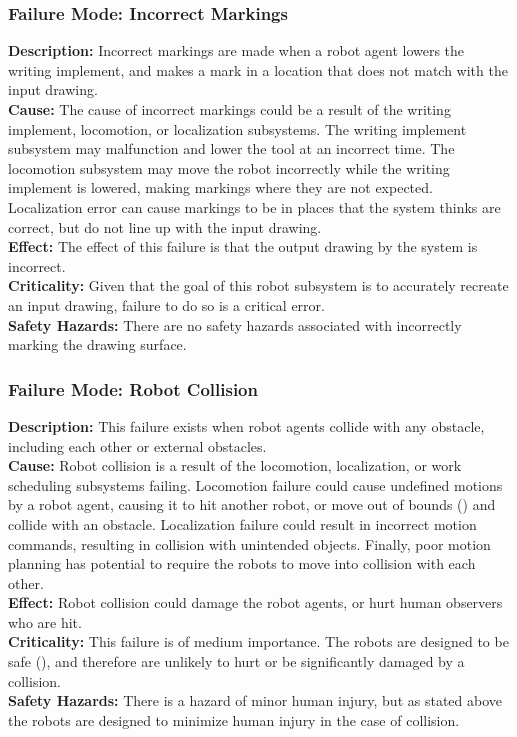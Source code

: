 \subsubsection{Failure Mode: Incorrect Markings}
\label{sec:sys_val_fm_markings}
\textbf{Description:} Incorrect markings are made when a robot agent lowers the writing implement, and makes a mark in a location that does not match with the input drawing. \\
\textbf{Cause:} The cause of incorrect markings could be a result of the writing implement, locomotion, or localization subsystems. The writing implement subsystem may malfunction and lower the tool at an incorrect time. The locomotion subsystem may move the robot incorrectly while the writing implement is lowered, making markings where they are not expected. Localization error can cause markings to be in places that the system thinks are correct, but do not line up with the input drawing.\\
\textbf{Effect:} The effect of this failure is that the output drawing by the system is incorrect.\\
\textbf{Criticality:} Given that the goal of this robot subsystem is to accurately recreate an input drawing, failure to do so is a critical error.\\
\textbf{Safety Hazards:} There are no safety hazards associated with incorrectly marking the drawing surface.\\

\subsubsection{Failure Mode: Robot Collision}
\label{sec:sys_val_fm_collision}
\textbf{Description:} This failure exists when robot agents collide with any obstacle, including each other or external obstacles.\\
\textbf{Cause:} Robot collision is a result of the locomotion, localization, or work scheduling subsystems failing. Locomotion failure could cause undefined motions by a robot agent, causing it to hit another robot, or move out of bounds () and collide with an obstacle. Localization failure could result in incorrect motion commands, resulting in collision with unintended objects. Finally, poor motion planning has potential to require the robots to move into collision with each other.\\
\textbf{Effect:} Robot collision could damage the robot agents, or hurt human observers who are hit.\\
\textbf{Criticality:} This failure is of medium importance. The robots are designed to be safe (), and therefore are unlikely to hurt or be significantly damaged by a collision. \\
\textbf{Safety Hazards:} There is a hazard of minor human injury, but as stated above the robots are designed to minimize human injury in the case of collision.\\

